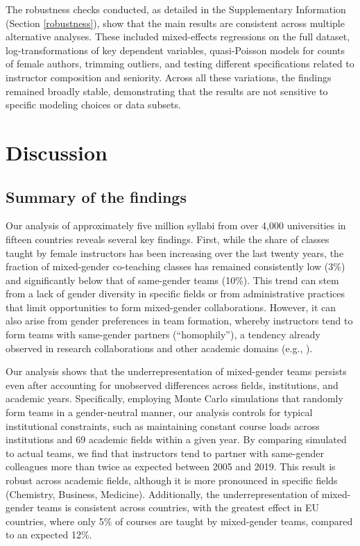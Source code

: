 \documentclass[
  11pt,
]{article}
\begin{document}
The robustness checks conducted, as detailed in the Supplementary Information (Section \ref{robustness}), show that the main results are consistent across multiple alternative analyses. These included mixed-effects regressions on the full dataset, log-transformations of key dependent variables, quasi-Poisson models for counts of female authors, trimming outliers, and testing different specifications related to instructor composition and seniority. Across all these variations, the findings remained broadly stable, demonstrating that the results are not sensitive to specific modeling choices or data subsets.

\section{Discussion}\label{discussion}

\subsection{Summary of the findings}\label{summary-of-the-findings}

Our analysis of approximately five million syllabi from over 4,000 universities in fifteen countries reveals several key findings. First, while the share of classes taught by female instructors has been increasing over the last twenty years, the fraction of mixed-gender co-teaching classes has remained consistently low (3\%) and significantly below that of same-gender teams (10\%). This trend can stem from a lack of gender diversity in specific fields or from administrative practices that limit opportunities to form mixed-gender collaborations. However, it can also arise from gender preferences in team formation, whereby instructors tend to form teams with same-gender partners (``homophily''), a tendency already observed in research collaborations and other academic domains (e.g., ).

Our analysis shows that the underrepresentation of mixed-gender teams persists even after accounting for unobserved differences across fields, institutions, and academic years. Specifically, employing Monte Carlo simulations that randomly form teams in a gender-neutral manner, our analysis controls for typical institutional constraints, such as maintaining constant course loads across institutions and 69 academic fields within a given year. By comparing simulated to actual teams, we find that instructors tend to partner with same-gender colleagues more than twice as expected between 2005 and 2019. This result is robust across academic fields, although it is more pronounced in specific fields (Chemistry, Business, Medicine). Additionally, the underrepresentation of mixed-gender teams is consistent across countries, with the greatest effect in EU countries, where only 5\% of courses are taught by mixed-gender teams, compared to an expected 12\%.
\end{document}
